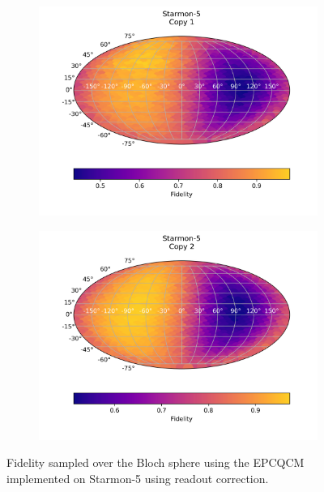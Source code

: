 \begin{figure}[H]
  \centering
  \begin{subfigure}{.5\textwidth}
    \centering
    \includegraphics[width=\textwidth]{Figures/Economical/Starmon/FullSphere/results_starmon_corrected_copy1.png}
    \label{fig:epc_corrected_starmon_sphere_1}
  \end{subfigure}%
  \begin{subfigure}{.5\textwidth}
    \centering
    \includegraphics[width=\textwidth]{Figures/Economical/Starmon/FullSphere/results_starmon_corrected_copy2.png}
    \label{fig:epc_corrected_starmon_sphere_2}
  \end{subfigure}
  \caption{Fidelity sampled over the Bloch sphere using the EPCQCM implemented on Starmon-5 using readout correction.}
  \label{fig:epc_corrected_starmon_sphere}
\end{figure}

